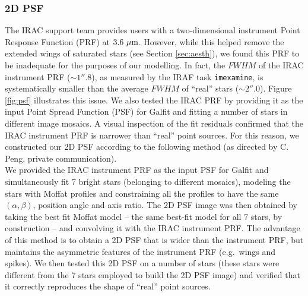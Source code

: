 \documentclass[preprint2]{emulateapj}
\begin{document}
\subsubsection{2D PSF}
The IRAC support team provides users with a two-dimensional instrument Point Response Function (PRF) at $3.6~\rm \mu m$.
However, while this helped remove the extended wings of saturated stars (see Section \ref{sec:aesth}), 
we found this PRF to be inadequate for the purposes of our modelling.
In fact, the $FWHM$ of the IRAC instrument PRF ($\sim 1''.8$), as measured by the IRAF task {\tt imexamine}, 
is systematically smaller than the average $FWHM$ of ``real'' stars ($\sim 2''.0$). 
Figure \ref{fig:psf} illustrates this issue.
We also tested the IRAC PRF by providing it as the input Point Spread Function (PSF) for Galfit 
and fitting a number of stars in different image mosaics.
A visual inspection of the fit residuals confirmed that the IRAC instrument PRF is narrower than ``real'' point sources.
For this reason, we constructed our 2D PSF according to the following method 
(as directed by C. Peng, private communication).\\
We provided the IRAC instrument PRF as the input PSF for Galfit 
and simultaneously fit 7 bright stars (belonging to different mosaics), 
modeling the stars with Moffat profiles 
and constraining all the profiles to have the same $(\alpha, \beta)$, position angle and axis ratio.
The 2D PSF image was then obtained by taking the best fit Moffat model -- the same best-fit model for all 7 stars, by construction -- 
and convolving it with the IRAC instrument PRF.
The advantage of this method is to obtain a 2D PSF that is wider than the instrument PRF, 
but maintains the asymmetric features of the instrument PRF (e.g.~wings and spikes).
We then tested this 2D PSF 
on a number of stars (these stars were different from the 7 stars employed to build the 2D PSF image)
and verified that it correctly reproduces the shape of ``real'' point sources. 
\end{document}
